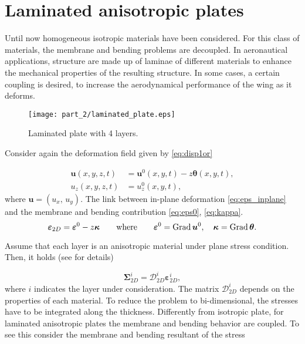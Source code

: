 \section{Laminated anisotropic plates}\label{sec:lamAnis}


Until now homogeneous isotropic materials have been considered. For this class of materials, the membrane and bending problems are decoupled. In aeronautical applications, structure are made up of laminae of different materials to enhance the mechanical properties of the resulting structure. In some cases, a certain coupling is desired, to increase the aerodynamical performance of the wing as it deforms.

\begin{figure}[tb]
	\centering
	\texttt{[image: part\_2/laminated\_plate.eps]}
	\caption{Laminated plate with 4 layers.}
	\label{fig:laminated_plate}
\end{figure}

Consider again the deformation field given by \eqref{eq:disp1or}

\begin{equation*}\label{eq:dis1or_2}
\begin{aligned}
\bm{u}(x,y,z,t) &= \bm{u}^0(x,y,t) -z \bm{\theta}(x,y,t), \\
u_z(x,y,z,t) &= u_z^0(x,y,t), 
\end{aligned}
\end{equation*}
where $\bm{u} = (u_x, \, u_y)$. The link between in-plane deformation \eqref{eq:eps_inplane} and the membrane and bending contribution \eqref{eq:eps0}, \eqref{eq:kappa}.
\begin{equation}
\bm{\varepsilon}_{2D} = \bm{\varepsilon}^0 - z \bm{\kappa} \qquad \text{where} \qquad \bm{\varepsilon}^0=\operatorname*{Grad} \bm{u}^0, \quad \bm{\kappa} = \operatorname*{Grad} \bm{\theta}.
\end{equation}

Assume that each layer is an anisotropic material under plane stress condition. Then, it holds (see \cite[Chapter 1]{reddy2003mechanics} for details)

\begin{equation*}
\bm{\Sigma}_{2D}^i = \bm{\mathcal{D}}_{2D}^i \bm{\varepsilon}_{2D}^i,
\end{equation*}  
where $i$ indicates the layer under consideration. The matrix $ \bm{\mathcal{D}}_{2D}^i$ depends on the properties of each material. To reduce the problem to bi-dimensional,  the stresses have to be integrated along the thickness. Differently from isotropic plate, for laminated anisotropic plates the membrane and bending behavior are coupled. To see this consider the membrane and bending resultant of the stress 

